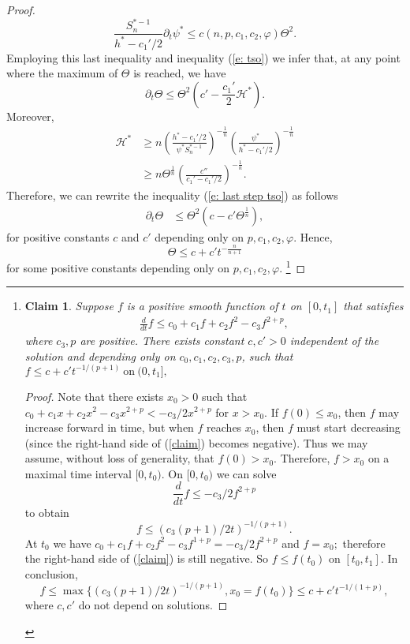 \documentclass{amsart}
\newtheorem*{claim}{Claim}
\theoremstyle{definition}
\theoremstyle{remark}
\numberwithin{equation}{section}
\begin{document}
\begin{proof}
\[\frac{S_{n}^{\ast-1}}{h^{\ast}-c_1'/2}\partial_t \psi^{\ast}\leq c(n,p,c_1,c_2,\varphi)\Theta^2.\]
Employing this last inequality and inequality (\ref{e: tso}) we infer that, at any point where the maximum of $\Theta$ is reached, we have
\begin{equation}\label{e: last step tso}
\partial_t\Theta\leq\Theta^2\left(c'-\frac{c_1'}{2}\mathcal{H}^{\ast}\right).
\end{equation}
Moreover,
\begin{align*}
\mathcal{H}^{\ast}&\geq n\left(\frac{h^{\ast}-c_1'/2}{\psi^{\ast} S_{n}^{\ast-1}}\right)^{-\frac{1}{n}}
\left(\frac{\psi^{\ast}}{h^{\ast}-c_1'/2}\right)^{-\frac{1}{n}}\\
&\geq n\Theta^{\frac{1}{n}} \left(\frac{c''}{c_1'-c_1'/2}\right)^{-\frac{1}{n}}.
\end{align*}
Therefore, we can rewrite the inequality (\ref{e: last step tso}) as follows
\begin{align*}
\partial_t\Theta&\leq \Theta^2\left(c-c'\Theta^{\frac{1}{n}} \right),
\end{align*} for positive constants $c$ and $c'$ depending only on $p,c_1,c_2,\varphi.$
Hence,
\begin{equation}\label{ie: upper on psi}
\Theta\leq c+c't^{-\frac{n}{n+1}}
\end{equation}
for some positive constants depending only on $p,c_1,c_2,\varphi.$
\footnote{
\begin{claim}Suppose $f$ is a positive smooth function of $t$ on $[0,t_1]$ that satisfies
\begin{align}\label{claim}
\frac{d}{dt}f\leq c_0+c_1f+c_2f^2-c_3f^{2+p},
\end{align}
where $c_3,p$ are positive. There exists constant $c,c'>0$ independent of the solution and depending only on $c_0,c_1,c_2,c_3,p$, such that $f\leq c+c't^{-1/(p+1)}~\mbox{on}~(0,t_1],$
\end{claim}
\begin{proof}
Note that there exists $x_0>0$ such that $c_0+c_1x+c_2x^2-c_3x^{2+p}<-c_3/2x^{2+p}$ for $x>x_0.$ If $f(0)\leq x_0$, then $f$ may increase forward in time, but when $f$ reaches $x_0$, then $f$ must start decreasing (since the right-hand side of (\ref{claim}) becomes negative).
Thus we may assume, without loss of generality, that $f(0)>x_0.$ Therefore, $f>x_0$ on a maximal time interval $[0,t_0).$ On $[0,t_0)$ we can solve
$$\frac{d}{dt}f\le-c_3/2f^{2+p}$$ to obtain
$$f\leq (c_3(p+1)/2t)^{-1/(p+1)}.$$
At $t_0$ we have $c_0+c_1f+c_2f^2-c_3f^{1+p}=-c_3/2f^{2+p}$ and $f=x_0;$ therefore the right-hand side of (\ref{claim}) is still negative. So $f\le f(t_0)$ on $[t_0,t_1].$ In conclusion, $$f\leq \max\{(c_3(p+1)/2t)^{-1/(p+1)}, x_0=f(t_0)\}\leq c+c't^{-1/(1+p)},$$ where $c,c'$ do not depend on solutions.

\end{proof}}
\end{proof}
\end{document}
